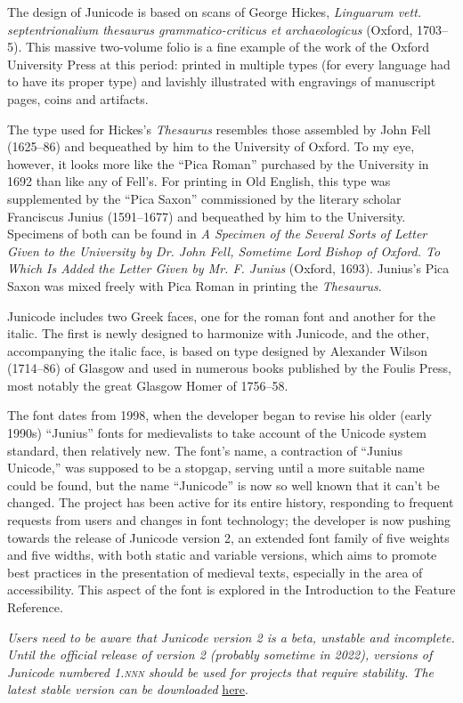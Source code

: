 \documentclass[12pt,letterpaper,openany]{book}
\newcounter{Feature}
\begin{document}
{\large%
\noindent The design of Junicode is based on scans of George Hickes,
{\itshape Linguarum vett. septentrionalium thesaurus
grammatico-criticus et archaeologicus} (Oxford, 1703–5). This massive two-volume folio is a fine
example of the work of the Oxford University Press at this
period: printed in multiple types (for every language had to
have its proper type) and lavishly
illustrated with engravings of manuscript pages, coins and
artifacts.

The type used for Hickes’s {\itshape Thesaurus} resembles those assembled
by John Fell (1625–86) and bequeathed by him to the University of
Oxford. To my eye, however, it looks more like the “Pica Roman”
purchased by the University in 1692 than like any of Fell’s. For printing in Old English, this type was
supplemented by the “Pica Saxon” commissioned by the literary scholar
Franciscus Junius (1591–1677) and bequeathed by him to
the University. Specimens of both can be found in {\itshape A Specimen of the
Several Sorts of Letter Given to the University by Dr. John Fell,
Sometime Lord Bishop of Oxford. To Which Is Added the Letter Given by
Mr. F. Junius} (Oxford, 1693). Junius’s Pica Saxon
was mixed freely with Pica Roman in printing the {\itshape Thesaurus}.

Junicode includes two Greek faces, one for the roman font and another
for the italic. The first is newly designed to harmonize with Junicode,
and the other, accompanying the italic face, is based on type designed by Alexander
Wilson (1714–86) of Glasgow and used in numerous books published by
the Foulis Press, most notably the great Glasgow Homer of 1756–58.

The font dates from 1998, when the developer began to revise his
older (early 1990s) “Junius” fonts for medievalists to take account of the Unicode
system standard, then relatively new. The font’s name, a contraction of
“Junius Unicode,” was supposed to be a stopgap, serving until a more suitable name
could be found, but the name “Junicode” is now so well known that it can’t be
changed. The project has been active for its entire history, responding to
frequent
requests from users and changes in font technology; the developer is now pushing
towards the release of Junicode version 2, an extended font family of five weights
and five widths, with both static and variable versions, which aims to
promote best practices in the presentation of medieval texts, especially in
the area of accessibility. This aspect of the font is explored in the
Introduction to the Feature Reference.

\textit{Users need to be aware that Junicode version 2 is a beta, unstable and
incomplete. Until the official release of version 2 (probably sometime in 2022), versions of Junicode
numbered \textsc{1.nnn} should be used for projects that require
stability. The latest stable version can be downloaded} \href{https://github.com/psb1558/Junicode-font/releases}{here}.

}
\pagestyle{fancy}
\end{document}
